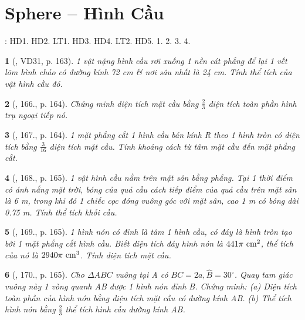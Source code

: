 \documentclass{article}
\newtheorem{baitoan}{}
\begin{document}

\section{Sphere -- Hình Cầu}
\cite[Chap. X, \S3, pp. 104--108]{SGK_Toan_9_Canh_Dieu_tap_1}: HD1. HD2. LT1. HD3. HD4. LT2. HD5. 1. 2. 3. 4.

\begin{baitoan}[\cite{Tuyen_Toan_9_old}, VD31, p. 163]
	1 vật nặng hình cầu rơi xuống 1 nền cát phẳng để lại 1 vết lõm hình chảo có đường kính {\rm72 cm} \& nơi sâu nhất là {\rm24 cm}. Tính thể tích của vật hình cầu đó.
\end{baitoan}

\begin{baitoan}[\cite{Tuyen_Toan_9_old}, 166., p. 164]
	Chứng minh diện tích mặt cầu bằng $\frac{2}{3}$ diện tích toàn phần hình trụ ngoại tiếp nó.
\end{baitoan}

\begin{baitoan}[\cite{Tuyen_Toan_9_old}, 167., p. 164]
	1 mặt phẳng cắt 1 hình cầu bán kính R theo 1 hình tròn có diện tích bằng $\frac{3}{16}$ diện tích mặt cầu. Tính khoảng cách từ tâm mặt cầu đến mặt phẳng cắt.
\end{baitoan}

\begin{baitoan}[\cite{Tuyen_Toan_9_old}, 168., p. 165]
	1 vật hình cầu nằm trên mặt sân bằng phẳng. Tại 1 thời điểm có ánh nắng mặt trời, bóng của quả cầu cách tiếp điểm của quả cầu trên mặt sân là {\rm6 m}, trong khi đó 1 chiếc cọc đóng vuông góc với mặt sân, cao {\rm1 m} có bóng dài {\rm0.75 m}. Tính thể tích khối cầu.
\end{baitoan}

\begin{baitoan}[\cite{Tuyen_Toan_9_old}, 169., p. 165]
	1 hình nón có đỉnh là tâm 1 hình cầu, có đáy là hình tròn tạo bởi 1 mặt phẳng cắt hình cầu. Biết diện tích đáy hình nón là $441\pi\ {\rm cm}^2$, thể tích của nó là $2940\pi\ {\rm cm}^3$. Tính diện tích mặt cầu.
\end{baitoan}

\begin{baitoan}[\cite{Tuyen_Toan_9_old}, 170., p. 165]
	Cho $\Delta ABC$ vuông tại A có $BC = 2a,\widehat{B} = 30^\circ$. Quay tam giác vuông này 1 vòng quanh AB được 1 hình nón đỉnh B. Chứng minh: (a) Diện tích toàn phần của hình nón bằng diện tích mặt cầu có đường kính AB. (b) Thể tích hình nón bằng $\frac{2}{3}$ thể tích hình cầu đường kính AB.
\end{baitoan}
\end{document}
